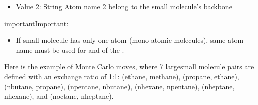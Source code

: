 \documentclass[letterpaper,10pt,english]{sphinxmanual}
\begin{document}
\begin{description}
\begin{itemize}
\item {} 
\sphinxAtStartPar
Value 2: String \sphinxhyphen{} Atom name 2 belong to the small molecule’s backbone

\end{itemize}

\begin{sphinxadmonition}{important}{Important:}\begin{itemize}
\item {} 
\sphinxAtStartPar
If small molecule has only one atom (mono atomic molecules), same atom name must be used for  and  of the .

\end{itemize}
\end{sphinxadmonition}

\end{description}

\sphinxAtStartPar
Here is the example of  Monte Carlo moves, where 7 large\sphinxhyphen{}small molecule pairs are defined with an exchange ratio of 1:1: (ethane, methane), (propane, ethane), (n\sphinxhyphen{}butane, propane), (n\sphinxhyphen{}pentane, nbutane), (n\sphinxhyphen{}hexane, n\sphinxhyphen{}pentane), (n\sphinxhyphen{}heptane, n\sphinxhyphen{}hexane), and (noctane, n\sphinxhyphen{}heptane).
\end{document}
